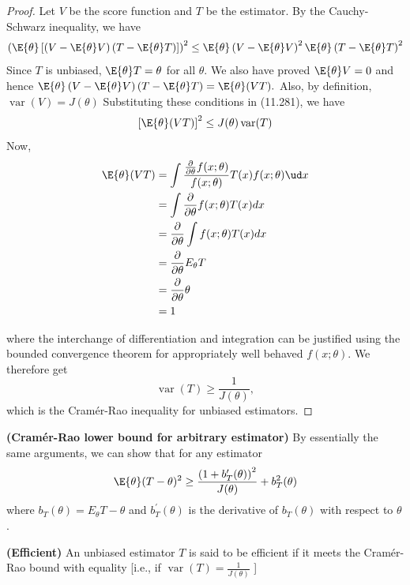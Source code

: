 \documentclass{article}
\newcommand{\bfs}[1]{\textbf{({#1})}}
\begin{document}
\begin{proof}
Let $V$ be the score function and $T$ be the estimator. By the Cauchy-Schwarz inequality, we have
$$
\left(\E{\theta}\left[\left(V-\E{\theta} V\right)\left(T-\E{\theta} T\right)\right]\right)^{2} \leq \E{\theta}\left(V-\E{\theta} V\right)^{2} \E{\theta}\left(T-\E{\theta} T\right)^{2}
$$
Since $T$ is unbiased, $\E{\theta} T=\theta$ for all $\theta .$ We also have proved $\E{\theta} V=0$ and hence $\E{\theta}\left(V-\E{\theta} V\right)\left(T-\E{\theta} T\right)=\E{\theta}(V T) .$ Also, by definition, $\operatorname{var}(V)=J(\theta)$
Substituting these conditions in (11.281), we have
$$
\left[\E{\theta}(V T)\right]^{2} \leq J(\theta) \operatorname{var}(T)
$$
Now,
\begin{align*}
   \E{\theta}(V T)&=\int \frac{\frac{\partial}{\partial \theta} f(x ; \theta)}{f(x ; \theta)} T(x) f(x ; \theta) \ud x\\
&=\int \frac{\partial}{\partial \theta} f(x ; \theta) T(x) d x \\
&=\frac{\partial}{\partial \theta} \int f(x ; \theta) T(x) d x \\
&=\frac{\partial}{\partial \theta} E_{\theta} T \\
&=\frac{\partial}{\partial \theta} \theta \\
&=1 
\end{align*}

where the interchange of differentiation and integration can be justified using the bounded convergence theorem for appropriately well behaved $f(x ; \theta)$. We therefore get
$$
\operatorname{var}(T) \geq \frac{1}{J(\theta)},
$$
which is the Cramér-Rao inequality for unbiased estimators.
\end{proof}
\begin{rema}{\bfs{Cram\'{e}r-Rao lower bound for arbitrary estimator}}\label{es:remaboundany}
By essentially the same arguments, we can show that for any estimator
$$
\E{\theta}(T-\theta)^{2} \geq \frac{\left(1+b_{T}^{\prime}(\theta)\right)^{2}}{J(\theta)}+b_{T}^{2}(\theta)
$$
where $b_{T}(\theta)=E_{\theta} T-\theta$ and $b_{T}^{\prime}(\theta)$ is the derivative of $b_{T}(\theta)$ with respect to $\theta$.
\end{rema}


\begin{defa}{\bfs{Efficient}}
An unbiased estimator $T$ is said to be efficient if it meets the Cramér-Rao bound with equality [i.e., if $\operatorname{var}(T)=\frac{1}{J(\theta)}$ ]
\end{defa} 













\end{document}
